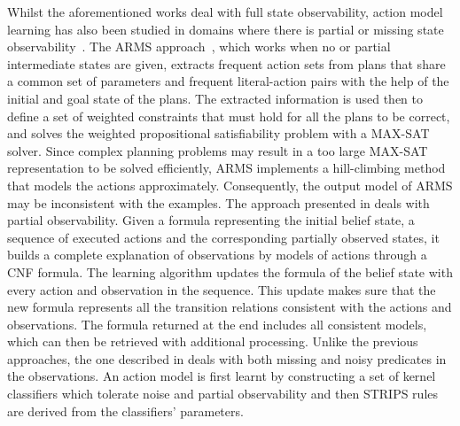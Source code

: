 \documentclass[letterpaper]{article} %
\begin{document}
Whilst the aforementioned works deal with full state observability, action model learning has also been studied in domains
where there is partial or missing state observability~\cite{jimenez2012review}. The {\sf ARMS} approach~\cite{yang2007learning}, which works when no or partial intermediate states are given, extracts frequent action sets from plans that share a common set of parameters and frequent literal-action pairs with the help of the initial and goal state of the plans. The extracted information is used then to define a set of weighted constraints that must hold for all the plans to be correct, and solves the weighted propositional satisfiability problem with a MAX-SAT solver. Since complex planning problems may result in a too large MAX-SAT representation to be solved efficiently, {\sf ARMS} implements a hill-climbing method that models the actions approximately. Consequently, the output model of {\sf ARMS} may be inconsistent with the examples. The approach presented in \cite{amir:alearning:JAIR08} deals with partial observability. Given a formula representing the initial belief state, a sequence of executed actions and the corresponding partially observed states, it builds a complete explanation
of observations by models of actions through a CNF formula. The learning algorithm updates the formula of the belief state with every action and observation in the sequence. This update makes sure that the new formula represents all the transition relations consistent with the actions and observations. The formula returned at the end includes all consistent models, which can then be retrieved with additional processing. Unlike the previous approaches, the one described in \cite{MouraoZPS12} deals with both missing and noisy predicates in the observations. An action model is first learnt by constructing a set of kernel classifiers which tolerate noise and partial observability and then STRIPS rules are derived from the classifiers' parameters.
\end{document}

